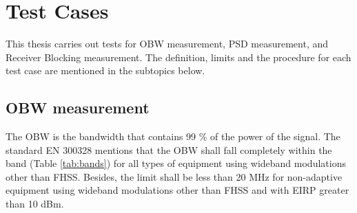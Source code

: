 \chapter{Test Cases}\label{chap:test}

This thesis carries out tests for \acf{OBW} measurement, \acf{PSD} measurement, and Receiver Blocking measurement. The definition, limits and the procedure for each test case are mentioned in the subtopics below.

\section{\acl{OBW} measurement}
\label{sec:obw}

The \acf{OBW} is the bandwidth that contains 99 \% of the power of the signal. The standard EN 300328 mentions that the \acf{OBW} shall fall completely within the band (Table \ref{tab:bands}) for all types of equipment using wideband modulations other than \acs{FHSS}.  Besides, the limit shall be less than 20 MHz for non-adaptive equipment using wideband modulations other than \acs{FHSS} and with \acs{EIRP} greater than 10 dBm.

